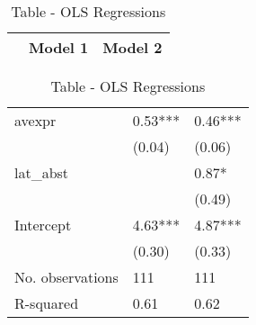 \begin{table}
\caption{Table - OLS Regressions} \\
\begin{center}
\begin{tabular}{lcc}
\hline
                 & Model 1 & Model 2  \\
\hline
\hline
\end{tabular}
\begin{tabular}{lll}
avexpr           & 0.53*** & 0.46***  \\
                 & (0.04)  & (0.06)   \\
lat\_abst        &         & 0.87*    \\
                 &         & (0.49)   \\
Intercept        & 4.63*** & 4.87***  \\
                 & (0.30)  & (0.33)   \\
No. observations & 111     & 111      \\
R-squared        & 0.61    & 0.62     \\
\hline
\end{tabular}
\end{center}
\end{table}